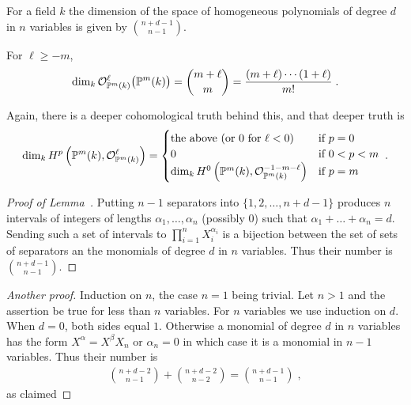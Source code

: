 \documentclass[a4paper,parskip=half,numbers=enddot, DIV=12]{scrreprt}
\begin{document}
\begin{lem}
    For a field $k$ the dimension of the space of homogeneous polynomials of degree $d$ in $n$ variables is given by $\binom{n+d-1}{n-1}$.
\end{lem}
\begin{cor}
	For $\ell\geq -m$,
    \begin{align*}
        \dim_k\mathcal{O}_{\mathbb{P}^m(k)}^\ell\big(\mathbb{P}^m(k)\big) = \binom{m+\ell}{m} = \frac{(m+\ell)\cdots (1+\ell)}{m!}\;.
    \end{align*}
\end{cor}
\begin{rem*}
	Again, there is a deeper cohomological truth behind this, and that deeper truth is
	\begin{align*}
		\dim_kH^p\left(\mathbb{P}^m(k),\mathcal{O}_{\mathbb{P}^m(k)}^\ell\right)=
		\begin{cases}
			\text{the above (or $0$ for $\ell<0$)} & \text{if }p=0\\
			0 & \text{if }0<p<m\\
			\dim_kH^0\left(\mathbb{P}^m(k),\mathcal{O}_{\mathbb{P}^m(k)}^{-1-m-\ell}\right) & \text{if }p=m
		\end{cases}\;.
	\end{align*}
\end{rem*}
\begin{proof}[Proof of Lemma~]
    Putting $n-1$ separators into $\{1,2,\ldots,n+d-1\}$ produces $n$ intervals of integers of lengths $\alpha_1,\ldots,\alpha_n$ (possibly $0$) such that $\alpha_1+\ldots+\alpha_n=d$. Sending such a set of intervals to $\prod_{i=1}^n X_i^{\alpha_i}$ is a bijection between the set of sets of separators an the monomials of degree $d$ in $n$ variables. Thus their number is $\binom{n+d-1}{n-1}$.
\end{proof}
\begin{proof}[Another proof]
    Induction on $n$, the case $n=1$ being trivial. Let $n>1$ and the assertion be true for less than $n$ variables. For $n$ variables we use induction on $d$. When $d=0$, both sides equal $1$. Otherwise a monomial of degree $d$ in $n$ variables has the form $X^\alpha = X^\beta X_n$ or $\alpha_n= 0$ in which case it is a monomial in $n-1$ variables. Thus their number is 
    \begin{align*}
         \binom{n+d-2}{n-1} +\binom{n+d-2}{n-2} = \binom{n+d-1}{n-1}\;,
    \end{align*}
    as claimed
\end{proof}
\end{document}
